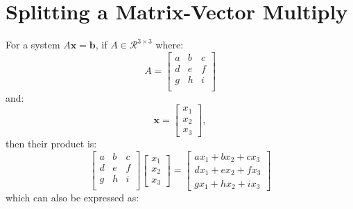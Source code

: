 \documentclass[ltr]{ornltm} %
\numberwithin{equation}{section}
\begin{document}
	\appendix
	\acresetall %


	\section{Splitting a Matrix-Vector Multiply} \label{sec:matrix-vector-multiply}
	For a system $A\mathbf{x}=\mathbf{b}$, if $A\in \mathcal{R}^{3\times 3}$ where:
	\begin{equation}
		\label{eq:a-matrix}
		A = \begin{bmatrix}
				a & b & c \\
				d & e & f \\
				g & h & i \\
		\end{bmatrix}
	\end{equation}
	and:
	\begin{equation}
		\label{eq:x_vec}
		\mathbf{x} =
		\begin{bmatrix}
			x_1 \\
			x_2 \\
			x_3
		\end{bmatrix},
	\end{equation}
	then their product is:
	\begin{equation}
		\label{eq:ax-product}
		\begin{bmatrix}
			a & b & c \\
			d & e & f \\
			g & h & i \\
		\end{bmatrix}
		\begin{bmatrix}
			x_1 \\
			x_2 \\
			x_3
		\end{bmatrix}=
		\begin{bmatrix}
			ax_1+bx_2+cx_3 \\
			dx_1+ex_2+fx_3 \\
			gx_1+hx_2+ix_3
		\end{bmatrix}
	\end{equation}
	which can also be expressed as:
\end{document}
